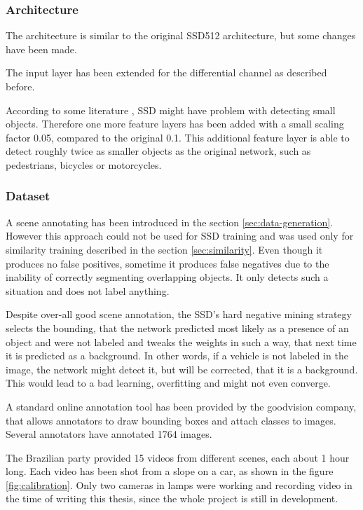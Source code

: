 \documentclass[a4paper,12pt,titlepage]{article}
\numberwithin{figure}{section}
\begin{document}
\subsubsection{Architecture}
The architecture is similar to the original SSD512 architecture, but some changes have been made. 

The input layer has been extended for the differential channel as described before. 

According to some literature \cite{cao2018feature}, SSD might have problem with detecting small objects. Therefore one more feature layers has been added with a small scaling factor 0.05, compared to the original 0.1. This additional feature layer is able to detect roughly twice as smaller objects as the original network, such as pedestrians, bicycles or motorcycles.

\subsubsection{Dataset}
A scene annotating has been introduced in the section \ref{sec:data-generation}. However this approach could not be used for SSD training and was used only for similarity training described in the section \ref{sec:similarity}. Even though it produces no false positives, sometime it produces false negatives due to the inability of correctly segmenting overlapping objects. It only detects such a situation and does not label anything.

Despite over-all good scene annotation, the SSD's hard negative mining strategy selects the bounding, that the network predicted most likely as a presence of an object and were not labeled and tweaks the weights in such a way, that next time it is predicted as a background. In other words, if a vehicle is not labeled in the image, the network might detect it, but will be corrected, that it is a background. This would lead to a bad learning, overfitting and might not even converge.

A standard online annotation tool has been provided by the goodvision company, that allows annotators to draw bounding boxes and attach classes to images. Several annotators have annotated 1764 images.

The Brazilian party provided 15 videos from different scenes, each about 1 hour long. Each video has been shot from a slope on a car, as shown in the figure \ref{fig:calibration}. Only two cameras in lamps were working and recording video in the time of writing this thesis, since the whole project is still in development. 
\end{document}
